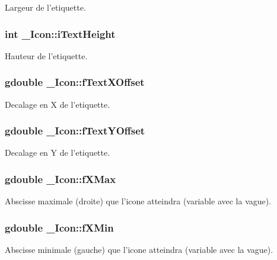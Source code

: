 Largeur de l'etiquette. 

\subsubsection{\setlength{\rightskip}{0pt plus 5cm}int {\bf \_\-Icon::iTextHeight}}\label{struct__Icon_7d3c6d0abb489f7d4eb7be7865163b10}


Hauteur de l'etiquette. 

\subsubsection{\setlength{\rightskip}{0pt plus 5cm}gdouble {\bf \_\-Icon::fTextXOffset}}\label{struct__Icon_732eeef9df7a86833b6e800be2bd6507}


Decalage en X de l'etiquette. 

\subsubsection{\setlength{\rightskip}{0pt plus 5cm}gdouble {\bf \_\-Icon::fTextYOffset}}\label{struct__Icon_0c5ce4dac4822d860c384824a1cfcff4}


Decalage en Y de l'etiquette. 

\subsubsection{\setlength{\rightskip}{0pt plus 5cm}gdouble {\bf \_\-Icon::fXMax}}\label{struct__Icon_7f54b7ebaa94e52a5e12d83f58358aee}


Abscisse maximale (droite) que l'icone atteindra (variable avec la vague). 

\subsubsection{\setlength{\rightskip}{0pt plus 5cm}gdouble {\bf \_\-Icon::fXMin}}\label{struct__Icon_2f88c0e4660fd55faeecdb3f412ec841}


Abscisse minimale (gauche) que l'icone atteindra (variable avec la vague). 

